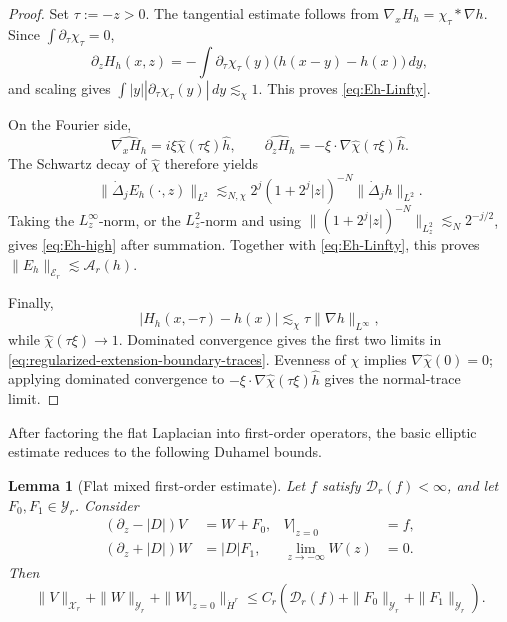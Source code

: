 \documentclass[12pt]{amsart}
\newtheorem{lemma}[theorem]{Lemma}
\theoremstyle{remark}
\theoremstyle{definition}
\numberwithin{equation}{section}
\begin{document}
\begin{proof}
Set \(\tau:=-z>0\).
The tangential estimate follows from \(\nabla_xH_h=\chi_\tau*\nabla h\). 
Since \(\int\partial_\tau\chi_\tau =0\),
\[
 \partial_zH_h(x,z)
 =-\int\partial_\tau\chi_\tau(y)\bigl(h(x-y)-h(x)\bigr)\,dy,
\]
and scaling gives
\(\int |y||\partial_\tau\chi_\tau(y)|\,dy\lesssim_\chi1\).
This proves \eqref{eq:Eh-Linfty}.

On the Fourier side,
\[
 \widehat{\nabla_xH_h}=i\xi\widehat\chi(\tau\xi)\widehat h, \qquad
 \widehat{\partial_zH_h}=-\xi\cdot\nabla\widehat\chi(\tau\xi)\widehat h.
\]
The Schwartz decay of \(\widehat\chi\) therefore yields
\[
 \|\dot\Delta_jE_h(\cdot,z)\|_{L^2}
 \lesssim_{N,\chi}2^j(1+2^j|z|)^{-N}
 \|\dot\Delta_jh\|_{L^2}.
\]
Taking the \(L^\infty_z\)-norm, or the \(L^2_z\)-norm and using
\(\|(1+2^j|z|)^{-N}\|_{L^2_z}\lesssim_N2^{-j/2}\), gives
\eqref{eq:Eh-high} after summation.  Together with
\eqref{eq:Eh-Linfty}, this proves
\(\|E_h\|_{\mathcal E_r}\lesssim\mathcal A_r(h)\).

Finally,
\[
 |H_h(x,-\tau)-h(x)|\lesssim_\chi
 \tau\|\nabla h\|_{L^\infty},
\]
while \(\widehat\chi(\tau\xi)\to1\).  Dominated convergence gives the
first two limits in \eqref{eq:regularized-extension-boundary-traces}.
Evenness of \(\chi\) implies \(\nabla\widehat\chi(0)=0\); applying dominated
convergence to \(-\xi\cdot\nabla\widehat\chi(\tau\xi)\widehat h\) gives the
normal-trace limit.
\end{proof}

After factoring the flat Laplacian into first-order operators, the basic elliptic estimate reduces to the following Duhamel bounds.

\begin{lemma}[Flat mixed first-order estimate]
\label{lem:flat-mixed-elliptic}
Let \(f\) satisfy \(\mathcal D_r(f)<\infty\), and let \(F_0,F_1\in\mathcal Y_r\).
Consider
\begin{align*}
 (\partial_z-|D|)V&=W+F_0, &V|_{z=0}&=f,\\
 (\partial_z+|D|)W&=|D|F_1, &\lim_{z\to-\infty}W(z)&=0.
\end{align*}
Then
\begin{equation*}
 \|V\|_{\mathcal X_r} + \|W\|_{\mathcal Y_r} + \|W|_{z=0}\|_{\dot H^r} \leq C_r \left( \mathcal D_r(f) + \|F_0\|_{\mathcal Y_r} + \|F_1\|_{\mathcal Y_r} \right).
\end{equation*}
\end{lemma}
\end{document}

